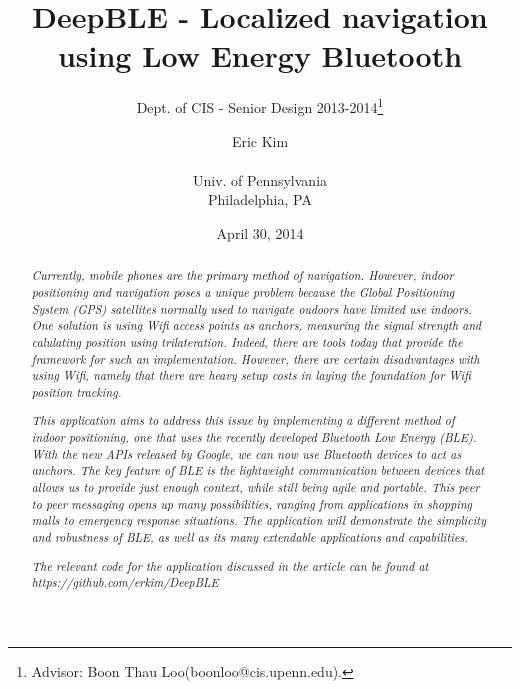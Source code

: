 \documentclass{sig-alternate}
\begin{document}
 

\title{DeepBLE - Localized navigation using Low Energy Bluetooth}
\subtitle{Dept. of CIS - Senior Design 2013-2014\thanks{Advisor: Boon Thau Loo(boonloo@cis.upenn.edu).}}
\author{
\alignauthor Eric Kim \\  \\ Univ. of Pennsylvania \\ Philadelphia, PA}
\date{April 30, 2014}
\maketitle

\begin{abstract}

  \textit{Currently, mobile phones are the primary method of navigation. 
	However, indoor positioning and navigation poses a unique problem
	because the Global Positioning System (GPS) satellites normally
	used to navigate oudoors have limited use indoors. One solution
	is using Wifi access points as anchors, measuring the signal 
	strength and calulating position using trilateration. Indeed, there
	are tools today that provide the framework for such an implementation.
	However, there are certain disadvantages with using Wifi, namely
	that there are heavy setup costs in laying the foundation for Wifi
	position tracking.}

  \textit{This application aims to address this issue by implementing a
	different method of indoor positioning, one that uses the recently
	developed Bluetooth Low Energy (BLE). With the new APIs 
	released by Google, we can now use Bluetooth devices to act as 
	anchors. The key feature of BLE is the lightweight communication
	between devices that allows us to provide just enough context,
	while still being agile and portable. This peer to peer messaging 
	opens up many possibilities, ranging from applications in shopping 
	malls to emergency response situations. The application will 
	demonstrate the simplicity and robustness of BLE, as well as its
	many extendable applications and capabilities. }

  \textit{The relevant code 
	for the application discussed in the article can be found at 
	https://github.com/erkim/DeepBLE}

\end{abstract}
\end{document}
